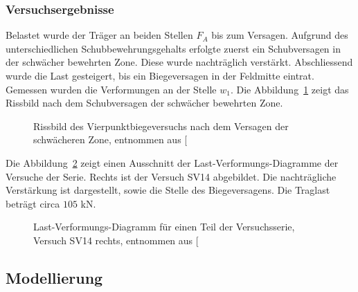 \documentclass[
  11pt,
  letterpaper,
]{scrreprt}
\begin{document}
\subsubsection{Versuchsergebnisse}\label{versuchsergebnisse-1}

Belastet wurde der Träger an beiden Stellen \(F_A\) bis zum Versagen.
Aufgrund des unterschiedlichen Schubbewehrungsgehalts erfolgte zuerst
ein Schubversagen in der schwächer bewehrten Zone. Diese wurde
nachträglich verstärkt. Abschliessend wurde die Last gesteigert, bis ein
Biegeversagen in der Feldmitte eintrat. Gemessen wurden die Verformungen
an der Stelle \(w_1\). Die Abbildung~\ref{fig-sv14_versuchsres_1} zeigt
das Rissbild nach dem Schubversagen der schwächer bewehrten Zone.

\begin{figure}[H]


\caption{\label{fig-sv14_versuchsres_1}Rissbild des
Vierpunktbiegeversuchs nach dem Versagen der schwächeren Zone, entnommen
aus {[}\citeproc{ref-tue_einfluss_2019}{3}{]}}

\end{figure}%

Die Abbildung~\ref{fig-sv14_versuchsres_2} zeigt einen Ausschnitt der
Last-Verformungs-Diagramme der Versuche der Serie. Rechts ist der
Versuch SV14 abgebildet. Die nachträgliche Verstärkung ist dargestellt,
sowie die Stelle des Biegeversagens. Die Traglast beträgt circa \(105\)
kN.

\begin{figure}[H]


\caption{\label{fig-sv14_versuchsres_2}Last-Verformungs-Diagramm für
einen Teil der Versuchsserie, Versuch SV14 rechts, entnommen aus
{[}\citeproc{ref-tue_einfluss_2019}{3}{]}}

\end{figure}%

\subsection{Modellierung}\label{modellierung-1}
\end{document}
